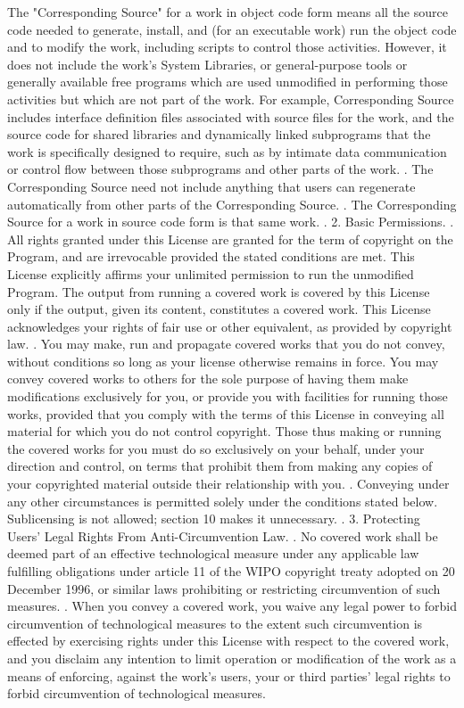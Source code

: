 \begin{script}
   The "Corresponding Source" for a work in object code form means all
 the source code needed to generate, install, and (for an executable
 work) run the object code and to modify the work, including scripts to
 control those activities.  However, it does not include the work's
 System Libraries, or general-purpose tools or generally available free
 programs which are used unmodified in performing those activities but
 which are not part of the work.  For example, Corresponding Source
 includes interface definition files associated with source files for
 the work, and the source code for shared libraries and dynamically
 linked subprograms that the work is specifically designed to require,
 such as by intimate data communication or control flow between those
 subprograms and other parts of the work.
 .
   The Corresponding Source need not include anything that users
 can regenerate automatically from other parts of the Corresponding
 Source.
 .
   The Corresponding Source for a work in source code form is that
 same work.
 .
   2. Basic Permissions.
 .
   All rights granted under this License are granted for the term of
 copyright on the Program, and are irrevocable provided the stated
 conditions are met.  This License explicitly affirms your unlimited
 permission to run the unmodified Program.  The output from running a
 covered work is covered by this License only if the output, given its
 content, constitutes a covered work.  This License acknowledges your
 rights of fair use or other equivalent, as provided by copyright law.
 .
   You may make, run and propagate covered works that you do not
 convey, without conditions so long as your license otherwise remains
 in force.  You may convey covered works to others for the sole purpose
 of having them make modifications exclusively for you, or provide you
 with facilities for running those works, provided that you comply with
 the terms of this License in conveying all material for which you do
 not control copyright.  Those thus making or running the covered works
 for you must do so exclusively on your behalf, under your direction
 and control, on terms that prohibit them from making any copies of
 your copyrighted material outside their relationship with you.
 .
   Conveying under any other circumstances is permitted solely under
 the conditions stated below.  Sublicensing is not allowed; section 10
 makes it unnecessary.
 .
   3. Protecting Users' Legal Rights From Anti-Circumvention Law.
 .
   No covered work shall be deemed part of an effective technological
 measure under any applicable law fulfilling obligations under article
 11 of the WIPO copyright treaty adopted on 20 December 1996, or
 similar laws prohibiting or restricting circumvention of such
 measures.
 .
   When you convey a covered work, you waive any legal power to forbid
 circumvention of technological measures to the extent such circumvention
 is effected by exercising rights under this License with respect to
 the covered work, and you disclaim any intention to limit operation or
 modification of the work as a means of enforcing, against the work's
 users, your or third parties' legal rights to forbid circumvention of
 technological measures.
\end{script}

